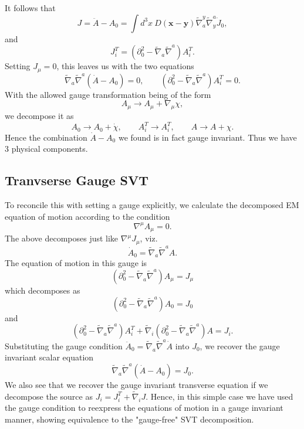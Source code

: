 \documentclass[10pt,letterpaper]{article}
\numberwithin{equation}{subsection}
\begin{document}
It follows that
\begin{equation}
J = \ddot A - A_0 =\int d^3x \ D(\mathbf x - \mathbf y) \tilde\nabla_a^y \tilde\nabla^a_y \dot J_0,
\end{equation}
and 
\begin{equation}
J_i^T =  \left(\partial_0^2 - \tilde\nabla_a\tilde\nabla^a\right)A_i^T.
\end{equation}
Setting $J_\mu = 0$, this leaves us with the two equations
\begin{equation}
\boxed{
\tilde\nabla_a \tilde\nabla^a \left(\dot A - A_0\right) = 0,\qquad   \left(\partial_0^2 - \tilde\nabla_a\tilde\nabla^a\right)A_i^T=0.}
\end{equation}
With the allowed gauge transformation being of the form
\begin{equation}
A_{\mu} \to A_{\mu} + \nabla_\mu \chi,
\end{equation}
we decompose it as
\begin{equation}
A_0 \to A_0 + \dot \chi,\qquad A^T_i \to A^T_i,\qquad A \to A + \chi.
\end{equation}
Hence the combination $\dot A - A_0$ we found is in fact gauge invariant. Thus we have 3 physical components. 
\subsection{Tranvserse Gauge SVT}
To reconcile this with setting a gauge explicitly, we calculate the decomposed EM equation of motion according to the condition
\begin{equation}
	\nabla^\mu A_\mu = 0.
\end{equation}
The above decomposes just like $\nabla^\mu J_{\mu}$, viz.
\begin{equation}
\dot A_0 = \tilde\nabla_a \tilde\nabla^a A.
\end{equation}
The equation of motion in this gauge is 
\begin{equation}
 \left(\partial_0^2 - \tilde\nabla_a\tilde\nabla^a\right)A_\mu=J_{\mu}
\end{equation}
which decomposes as
\begin{equation}
 \left(\partial_0^2 - \tilde\nabla_a\tilde\nabla^a\right)A_0=J_{0}
\end{equation}
and
\begin{equation}
 \left(\partial_0^2 - \tilde\nabla_a\tilde\nabla^a\right)A_i^T +  \tilde\nabla_i\left(\partial_0^2 - \tilde\nabla_a\tilde\nabla^a\right)A=J_i.
\end{equation}
Substituting the gauge condition $\ddot A_0 = \tilde\nabla_a\tilde\nabla^a \dot A$ into $J_0$, we recover the gauge invariant scalar equation
\begin{equation}
\tilde\nabla_a \tilde\nabla^a \left(\dot A - A_0\right) = J_0.
\end{equation}
We also see that we recover the gauge invariant transverse equation if we decompose the source as $J_i = J_i^T + \tilde\nabla_i J$. Hence, in this simple case we have used the gauge condition to reexpress the equations of motion in a gauge invariant manner, showing equivalence to the "gauge-free" SVT decomposition.
\end{document}
